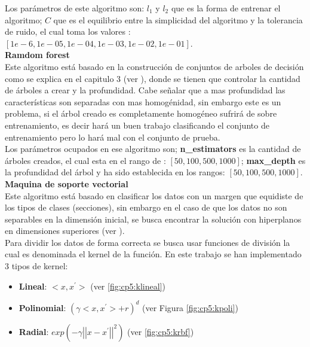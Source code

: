 Los parámetros de este algoritmo son: $l_1$ y $l_2$ que es la forma de entrenar el algoritmo; $C$ que es el equilibrio entre la simplicidad del algoritmo y la tolerancia de ruido, el cual toma los valores :$[1e-6, 1e-05, 1e-04, 1e-03, 1e-02, 1e-01]$.\\





\textbf{Ramdom forest}\\

Este algoritmo está basado en la construcción de conjuntos de arboles de decisión como se explica en el capitulo 3 (ver ), donde se tienen que controlar la cantidad de árboles a crear y la profundidad. Cabe señalar que a mas profundidad las características son separadas con mas homogénidad, sin embargo este es un problema, si el árbol creado es completamente homogéneo sufrirá de sobre entrenamiento, es decir hará un buen trabajo clasificando el conjunto de entrenamiento pero lo hará mal con el conjunto de prueba.\\

Los parámetros ocupados en ese algoritmo son; \textbf{n\_estimators} es la cantidad de árboles creados, el cual esta en el rango de : $[50, 100, 500, 1000]$; \textbf{max\_depth} es la profundidad del árbol y ha sido establecida en los rangos: $[50, 100, 500, 1000]$.\\

\textbf{Maquina de soporte vectorial}\\

Este algoritmo está basado en clasificar los datos con un margen que equidiste de los tipos de clases (secciones), sin embargo en el caso de que los datos no son separables en la dimensión inicial, se busca encontrar la solución con hiperplanos en dimensiones superiores (ver ).\\

Para dividir los datos de forma correcta se busca usar funciones de división la cual es denominada el kernel de la función. En este trabajo se han implementado 3 tipos de kernel: 

\begin{itemize}

	\item \textbf{Lineal}: $<x,x^{'}>$ (ver \ref{fig:cp5:klineal})

	\item \textbf{Polinomial}: $(\gamma <x,x^{'}>+r)^{d}$ (ver Figura \ref{fig:cp5:kpoli})

	\item \textbf{Radial}: $exp(-\gamma {\left|\left| x-x^{'} \right|\right|}^2)$ (ver \ref{fig:cp5:krbf})

\end{itemize}

